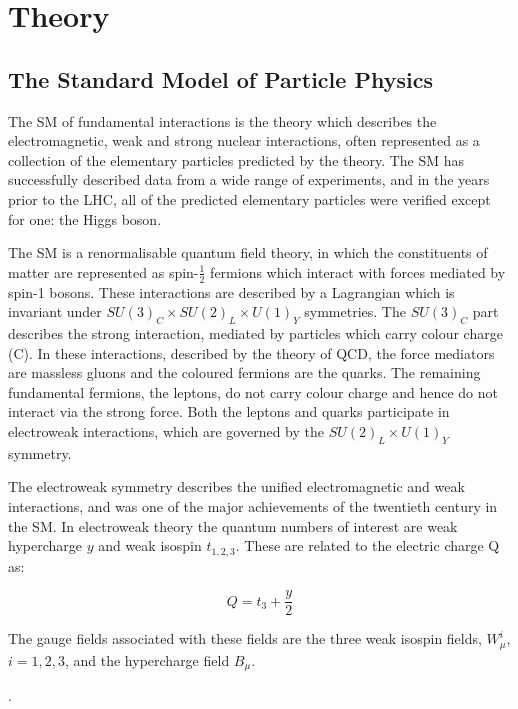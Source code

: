 \chapter{Theory}
\label{chap:theory}

\section{The Standard Model of Particle Physics}
\label{sec:theSM}

The \ac{SM} of fundamental interactions is the theory
which describes the electromagnetic, weak and strong nuclear interactions, often
represented as a collection of the elementary particles predicted by the theory.
The SM has successfully described data from a wide range of experiments, and in the 
years prior to the LHC, all of the predicted elementary particles were verified 
except for one: the Higgs boson.

The \ac{SM} is a renormalisable quantum field theory, in which the constituents of
matter are represented as spin-$\frac{1}{2}$ fermions which interact with
forces mediated by spin-1 bosons. These interactions are described by a
Lagrangian which is invariant under $SU(3)_{C} \times SU(2)_{L} \times U(1)_{Y}$
symmetries. The $SU(3)_{C}$ part describes the strong interaction, mediated by
particles which carry colour charge (C). In these interactions, described by the
theory of \ac{QCD}\cite{}, the force mediators are massless gluons
and the coloured fermions are the quarks. The remaining fundamental fermions,
the leptons, do not carry colour charge and hence do not interact via the strong
force. Both the leptons and quarks participate in electroweak interactions,
which are governed by the $SU(2)_{L} \times U(1)_{Y}$ symmetry.

The electroweak symmetry describes the unified electromagnetic and weak
interactions\cite{}, and was one of the major achievements of the twentieth
century in the \ac{SM}. In electroweak theory the quantum numbers of interest are
weak hypercharge $y$ and weak isospin $t_{1,2,3}$. These are related to the
electric charge Q as: 

\begin{equation}
Q = t_{3} + \frac{y}{2}
\end{equation}

The gauge fields associated with these fields are the three weak isospin fields,
$W_{\mu}^{i}$, $i = 1,2,3$, and the hypercharge field $B_{\mu}$.


\cite{GlashowPartialSymmetries,WeinbergModelOfLeptons,SalamNobelSymposium}.

